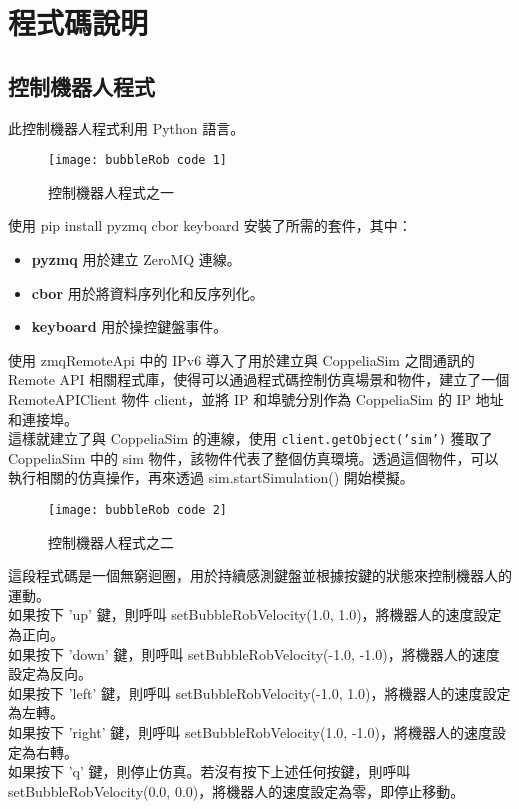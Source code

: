 \chapter{程式碼說明}
\renewcommand{\baselinestretch}{10.0} %
\setcounter{page}{5}  %
\fontsize{14pt}{2.5pt}\sectionef

\section{控制機器人程式}
此控制機器人程式利用 Python 語言。\\
\begin{figure}[hbt!]
\begin{center}
\texttt{[image: bubbleRob code 1]}
\caption{\Large 控制機器人程式之一}\label{控制機器人程式之一}
\end{center}
\end{figure} 
使用 pip install pyzmq cbor keyboard 安裝了所需的套件，其中：\\
\begin{itemize}
\item \textbf{pyzmq} 用於建立 ZeroMQ 連線。
\item \textbf{cbor} 用於將資料序列化和反序列化。
\item \textbf{keyboard} 用於操控鍵盤事件。
\end{itemize}
使用 zmqRemoteApi 中的 IPv6  導入了用於建立與 CoppeliaSim 之間通訊的 Remote API 相關程式庫，使得可以通過程式碼控制仿真場景和物件，建立了一個 RemoteAPIClient 物件 client，並將 IP 和埠號分別作為 CoppeliaSim 的 IP 地址和連接埠。\\
這樣就建立了與 CoppeliaSim 的連線，使用 \texttt{client.getObject('sim')} 獲取了 CoppeliaSim 中的 sim 物件，該物件代表了整個仿真環境。透過這個物件，可以執行相關的仿真操作，再來透過  sim.startSimulation() 開始模擬。\\
\newpage

\begin{figure}[hbt!]
\begin{center}
\texttt{[image: bubbleRob code 2]}
\caption{\Large 控制機器人程式之二}\label{控制機器人程式之二}
\end{center}
\end{figure} 
這段程式碼是一個無窮迴圈，用於持續感測鍵盤並根據按鍵的狀態來控制機器人的運動。\\
如果按下 'up' 鍵，則呼叫 setBubbleRobVelocity(1.0, 1.0)，將機器人的速度設定為正向。\\
如果按下 'down' 鍵，則呼叫 setBubbleRobVelocity(-1.0, -1.0)，將機器人的速度設定為反向。\\
如果按下 'left' 鍵，則呼叫 setBubbleRobVelocity(-1.0, 1.0)，將機器人的速度設定為左轉。\\
如果按下 'right' 鍵，則呼叫 setBubbleRobVelocity(1.0, -1.0)，將機器人的速度設定為右轉。\\
如果按下 'q' 鍵，則停止仿真。若沒有按下上述任何按鍵，則呼叫 setBubbleRobVelocity(0.0, 0.0)，將機器人的速度設定為零，即停止移動。\\
\newpage

